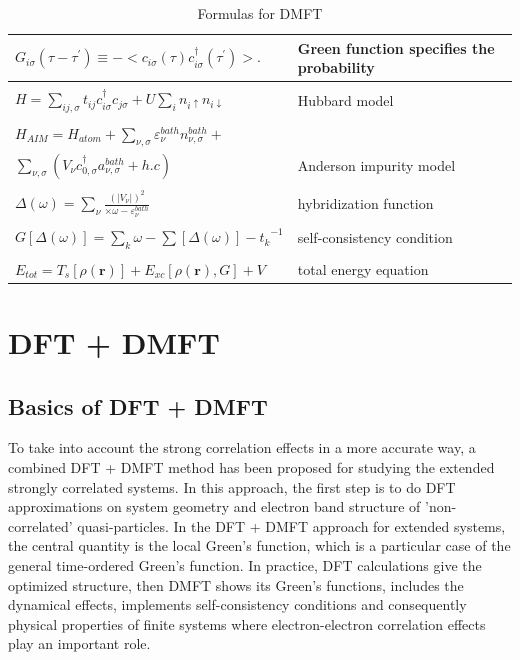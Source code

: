 \documentclass[12 pt]{article}
\begin{document}
  \begin{table}[ht]
    \centering
    \caption{Formulas for DMFT}
    \label{Formulas for DMFT}
    \vspace{2ex}

  \begin{tabular}{|l|l|}
    \hline
    $G_{i\sigma}(\tau-\tau^\prime)\equiv-<c_{i\sigma}(\tau)c_{i\sigma}^\dagger(\tau^\prime)>.$ &  Green function 
specifies the probability \\ \hline
    &\\
    $H=\sum\limits_{ij,\sigma} t_{ij}c_{i\sigma}^{\dagger}c_{j\sigma}+U\sum\limits_{i}n_{i\uparrow}n_{i\downarrow}$ 
&  Hubbard model\\ \hline
    &\\
    $H_{AIM} = H_{atom} + \sum\limits_{\nu,\sigma}\varepsilon_{\nu}^{bath}n_{\nu,\sigma}^{bath}+$\\
$\sum\limits_{\nu,\sigma}(V_{\nu}c_{0,\sigma}^{\dagger}a_{\nu,\sigma}^{bath}+h.c)$ &  Anderson impurity model\\ 
 \hline
    &\\
    $\varDelta(\omega) = \sum\limits_\nu \frac{(|V_\nu|)^2}{×\omega-\varepsilon_{\nu}^{bath}}$ &  hybridization 
function \\ \hline
    &\\
    $G[\varDelta(\omega)]=\sum\limits_k{\omega-\sum[\varDelta(\omega)]-t_k}^{-1}$ &  self-consistency condition 
\\ \hline
    &\\
    $E_{tot} = T_s[\rho(\textbf{r})] + E_{xc}[\rho (\textbf{r}), G] + V$ &  total energy equation \\ \hline

  \end{tabular}

  \end{table}
  \cleardoublepage

    \section{DFT + DMFT}

      \subsection{Basics of DFT + DMFT}

  To take into account the strong correlation effects in a more accurate way, a combined DFT + DMFT method has been 
proposed for studying the extended strongly correlated systems. In this approach, the first step is to do DFT 
approximations on system geometry and electron band structure of 'non-correlated' quasi-particles. In the DFT + DMFT 
approach for extended systems, the central quantity is the local Green's function, which is a particular case of 
the general time-ordered Green's function. In practice, DFT calculations give the optimized structure, then DMFT 
shows its Green's functions, includes the dynamical effects, implements self-consistency conditions and 
consequently physical properties of finite systems where electron-electron correlation effects play an important 
role. 
	
\end{document}
